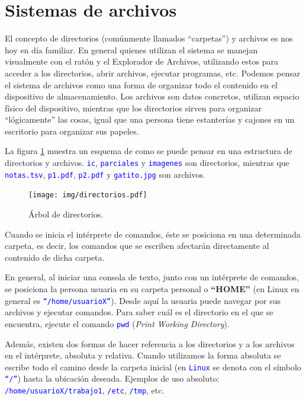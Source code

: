 \documentclass[12pt]{article}
\newcommand{\cw}[1]{\texttt{\textcolor{blue}{#1}}}
\begin{document}
\section{Sistemas de archivos}

\label{sec:sistemaDeArchivos}

El concepto de directorios (comúnmente llamados ``carpetas'') y archivos es
nos hoy en día familiar. En general quienes utilizan el sistema se manejan
visualmente con el ratón y el Explorador de Archivos, utilizando estos para
acceder a los directorios, abrir archivos, ejecutar programas, etc.  Podemos
pensar el sistema de archivos como una forma de organizar todo el contenido en
el dispositivo de almacenamiento. Los archivos son datos concretos, utilizan
espacio físico del dispositivo, mientras que los directorios sirven para
organizar ``lógicamente'' las cosas, igual que una persona tiene estanterías y
cajones en un escritorio para organizar sus papeles.

La figura \ref{arbolDirectorios}  muestra un esquema de como se puede pensar en
una estructura de directorios y archivos. \cw{ic}, \cw{parciales} y
\cw{imagenes} son directorios, mientras que \cw{notas.tsv}, \cw{p1.pdf},
\cw{p2.pdf} y \cw{gatito.jpg} son archivos.

\begin{figure}[!htb]

    \centering

    \texttt{[image: img/directorios.pdf]}

    \caption{Árbol de directorios.}

    \label{arbolDirectorios}

\end{figure}

Cuando se inicia el intérprete de comandos, éste se posiciona en una
determinada carpeta, es decir, los comandos que se escriben afectarán
directamente al contenido de dicha carpeta.

En general, al iniciar una consola de texto, junto con un intérprete de
comandos, se posiciona la persona usuaria en su carpeta personal o
\textbf{``HOME''} (en Linux en general es \cw{``/home/usuarioX''}). Desde aquí
la usuaria puede navegar por sus archivos y ejecutar comandos. Para saber cuál
es el directorio en el que se encuentra, ejecute el comando \cw{pwd}
(\emph{Print Working Directory}).

Además, existen dos formas de hacer referencia a los directorios y a los
archivos en el intérprete, absoluta y relativa. Cuando utilizamos la forma
absoluta se escribe todo el camino desde la carpeta inicial (en \cw{Linux}
se denota con el símbolo \cw{``/''}) hasta la ubicación deseada. Ejemplos de
uso absoluto: \cw{/home/usuarioX/trabajo1}, \cw{/etc}, \cw{/tmp}, etc.
\end{document}
